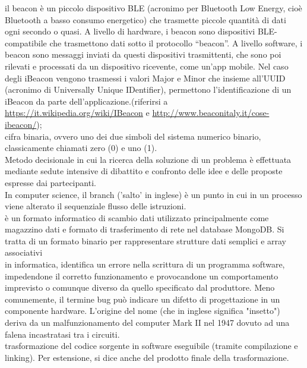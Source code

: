 \documentclass{scalatekids-article}
\begin{document}
 il beacon è un piccolo dispositivo BLE (acronimo per Bluetooth Low Energy, cioè Bluetooth a basso consumo energetico) che trasmette piccole quantità di dati ogni secondo o quasi.  A livello di hardware, i beacon sono dispositivi BLE-compatibile che trasmettono dati sotto il protocollo “beacon”.
A livello software, i beacon sono messaggi inviati da questi dispositivi trasmittenti, che sono poi rilevati e processati da un dispositivo ricevente, come un’app mobile. Nel caso degli iBeacon vengono trasmessi i valori Major e Minor che insieme all’UUID (acronimo di Universally Unique IDentifier), permettono l’identificazione di un iBeacon da parte dell’applicazione.(riferirsi a \url{https://it.wikipedia.org/wiki/IBeacon} e \url{http://www.beaconitaly.it/cose-ibeacon/});
\\

 cifra binaria, ovvero uno dei due simboli del sistema numerico binario, classicamente chiamati zero (0) e uno (1).
\\

 Metodo decisionale in cui la ricerca della soluzione di un problema è effettuata mediante sedute intensive di dibattito e confronto delle idee e delle proposte espresse dai partecipanti.
\\

 In computer science, il branch ('salto' in inglese) è un punto in cui in un processo viene alterato il sequenziale flusso delle istruzioni.
\\

 è un formato informatico di scambio dati utilizzato principalmente come magazzino dati e formato di trasferimento di rete nel database MongoDB. Si tratta di un formato binario per rappresentare strutture dati semplici e array associativi
\\

 in informatica, identifica un errore nella scrittura di un programma software, impedendone il corretto funzionamento e provocandone un comportamento imprevisto o comunque diverso da quello specificato dal produttore. Meno comunemente, il termine bug può indicare un difetto di progettazione in un componente hardware.
L'origine del nome (che in inglese significa "insetto") deriva da un malfunzionamento del computer Mark II nel 1947 dovuto ad una falena incastratasi tra i circuiti.
\\

 trasformazione del codice sorgente in software eseguibile (tramite compilazione e linking). Per estensione, si dice anche del prodotto finale della trasformazione.
\\
\end{document}
